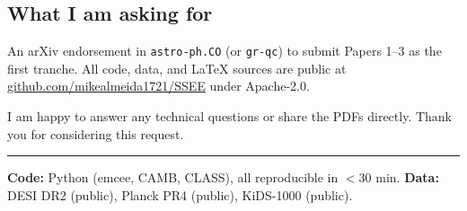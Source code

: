 \documentclass[11pt,a4paper]{article}
\begin{document}
\subsection*{What I am asking for}

An arXiv endorsement in \texttt{astro-ph.CO} (or \texttt{gr-qc}) to submit
Papers 1--3 as the first tranche. All code, data, and \LaTeX{} sources are
public at \href{https://github.com/mikealmeida1721/SSEE}{github.com/mikealmeida1721/SSEE}
under Apache-2.0.

I am happy to answer any technical questions or share the PDFs directly.
Thank you for considering this request.

\vspace{6pt}
\hrule
{\small \textbf{Code:} Python (emcee, CAMB, CLASS), all reproducible in $<$30 min.
\quad \textbf{Data:} DESI DR2 (public), Planck PR4 (public), KiDS-1000 (public).}
\end{document}
